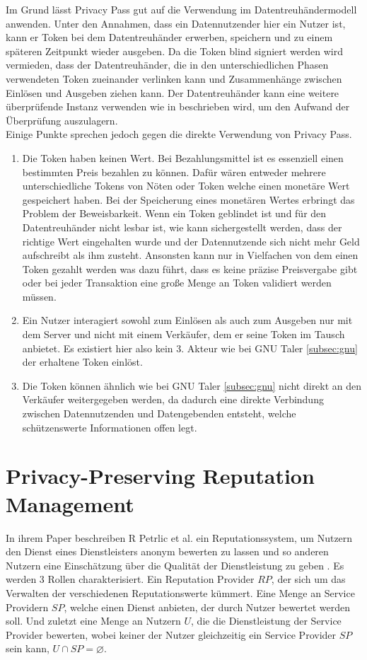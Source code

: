 \documentclass[11pt,a4paper]{scrreprt}
\begin{document}
Im Grund lässt Privacy Pass gut auf die Verwendung im Datentreuhändermodell anwenden. Unter den Annahmen, dass ein Datennutzender hier ein Nutzer ist, kann er Token bei dem Datentreuhänder erwerben, speichern und zu einem späteren Zeitpunkt wieder ausgeben. Da die Token blind signiert werden wird vermieden, dass der Datentreuhänder, die in den unterschiedlichen Phasen verwendeten Token zueinander verlinken kann und Zusammenhänge zwischen Einlösen und Ausgeben ziehen kann. Der Datentreuhänder kann eine weitere überprüfende Instanz verwenden wie in \cite{pp-davidson2018privacy} beschrieben wird, um den Aufwand der Überprüfung auszulagern. \\
Einige Punkte sprechen jedoch gegen die direkte Verwendung von Privacy Pass. 
\begin{enumerate}
    \item Die Token haben keinen Wert. Bei Bezahlungsmittel ist es essenziell einen bestimmten Preis bezahlen zu können. Dafür wären entweder mehrere unterschiedliche Tokens von Nöten oder Token welche einen monetäre Wert gespeichert haben. Bei der Speicherung eines monetären Wertes erbringt das Problem der Beweisbarkeit. Wenn ein Token geblindet ist und für den Datentreuhänder nicht lesbar ist, wie kann sichergestellt werden, dass der richtige Wert eingehalten wurde und der Datennutzende sich nicht mehr Geld aufschreibt als ihm zusteht. Ansonsten kann nur in Vielfachen von dem einen Token gezahlt werden was dazu führt, dass es keine präzise Preisvergabe gibt oder bei jeder Transaktion eine große Menge an Token validiert werden müssen.
    \item Ein Nutzer interagiert sowohl zum Einlösen als auch zum Ausgeben nur mit dem Server und nicht mit einem Verkäufer, dem er seine Token im Tausch anbietet. Es existiert hier also kein 3. Akteur wie bei GNU Taler \ref{subsec:gnu} der erhaltene Token einlöst.
    \item Die Token können ähnlich wie bei GNU Taler \ref{subsec:gnu} nicht direkt an den Verkäufer weitergegeben werden, da dadurch eine direkte Verbindung zwischen Datennutzenden und Datengebenden entsteht, welche schützenswerte Informationen offen legt.
\end{enumerate}

\section{Privacy-Preserving Reputation Management}
\label{subsec:rep}
In ihrem Paper beschreiben R Petrlic et al. ein Reputationssystem, um Nutzern den Dienst eines Dienstleisters anonym bewerten zu lassen und so anderen Nutzern eine Einschätzung über die Qualität der Dienstleistung zu geben \cite{petrlic2014privacy}. Es werden 3 Rollen charakterisiert. Ein Reputation Provider $RP$, der sich um das Verwalten der verschiedenen Reputationswerte kümmert. Eine Menge an Service Providern $SP$, welche einen Dienst anbieten, der durch Nutzer bewertet werden soll. Und zuletzt eine Menge an Nutzern $U$, die die Dienstleistung der Service Provider bewerten, wobei keiner der Nutzer gleichzeitig ein Service Provider $SP$ sein kann, $U \cap SP = \varnothing$. 
\end{document}
